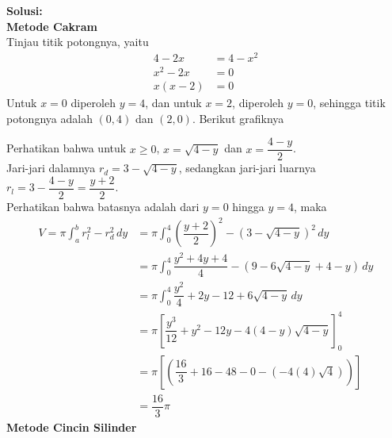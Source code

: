 \documentclass{article}
\begin{document}
\begin{enumerate}
		\textbf{Solusi:}\\
		\textbf{Metode Cakram}\\
		Tinjau titik potongnya, yaitu 
		\begin{align*}
		4-2x &= 4-x^2\\
		x^2-2x &= 0\\
		x(x-2) &=0
		\end{align*}
		Untuk $x=0$ diperoleh $y=4$, dan untuk $x=2$, diperoleh $y=0$, sehingga titik potongnya adalah $(0,4)$ dan $(2,0)$. Berikut grafiknya
		\begin{center}
		\end{center}
		Perhatikan bahwa untuk $x\geq 0$, $x=\sqrt{4-y}$ dan $x=\dfrac{4-y}{2}$. \\
		Jari-jari dalamnya $r_d=3-\sqrt{4-y}$, sedangkan jari-jari luarnya $r_l=3-\dfrac{4-y}{2}=\dfrac{y+2}{2}$.\\
		Perhatikan bahwa batasnya adalah dari $y=0$ hingga $y=4$, maka
		\begin{align*}
		V =\pi \int_a^b r_l^2-r_d^2\, dy &= \pi\int_0^4 \left(\dfrac{y+2}{2}\right)^2-(3-\sqrt{4-y})^2\, dy\\
		&= \pi \int_0^4 \dfrac{y^2+4y+4}{4}-(9-6\sqrt{4-y}+4-y)\, dy\\
		&= \pi \int_0^4 \dfrac{y^2}{4}+2y-12+6\sqrt{4-y}\, dy\\
		&= \pi \left[\dfrac{y^3}{12}+y^2-12y-4(4-y)\sqrt{4-y}\right]^4_0\\
		&= \pi \left[\left(\dfrac{16}{3}+16-48-0-\left(-4(4)\sqrt{4}\right)\right)\right]\\
		&= \dfrac{16}{3}\pi
		\end{align*}
		\newpage
		\textbf{Metode Cincin Silinder}\\

\end{enumerate}
\end{document}
